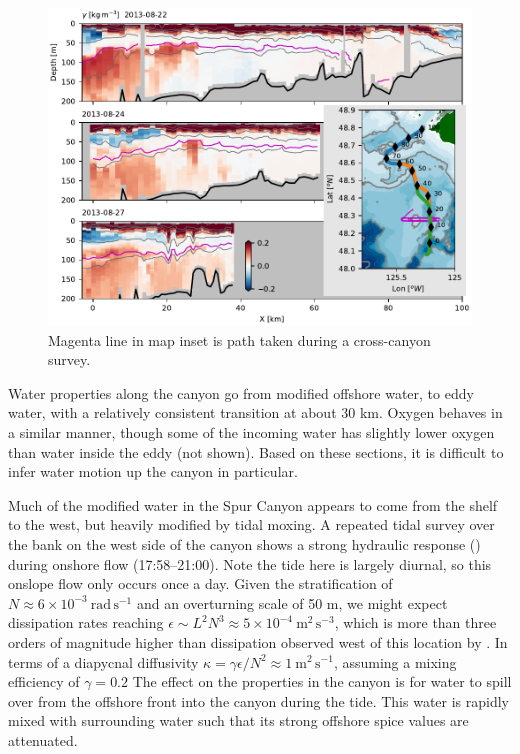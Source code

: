 \documentclass[draft]{agujournal2019}
\begin{document}
\begin{figure}[htbp]
  \begin{center}
    \includegraphics[width=6.2in]{CanyonPropertiesSpice}
    \caption{Magenta line in map inset is path taken during a cross-canyon survey.
      \label{fig:CanyonPropertiesSpice} }
  \end{center}
\end{figure}

Water properties along the canyon go from modified offshore water, to eddy water, with a relatively consistent transition at about 30 km.  Oxygen behaves in a similar manner, though some of the incoming water has slightly lower oxygen than water inside the eddy (not shown).  Based on these sections, it is difficult to infer water motion up the canyon in particular.

Much of the modified water in the Spur Canyon appears to come from the shelf to the west, but heavily modified by tidal moxing. A repeated tidal survey over the bank on the west side of the canyon shows a strong hydraulic response () during onshore flow (17:58--21:00).  Note the tide here is largely diurnal, so this onslope flow only occurs once a day.  Given the stratification of $N\approx 6\times10^{-3} \ \mathrm{rad\,s^{-1}}$ and an overturning scale of 50 m, we might expect dissipation rates reaching $\epsilon \sim L^2N^{3} \approx 5\times10^{-4}\ \mathrm{m^2\,s^{-3}}$, which is more than three orders of magnitude higher than dissipation observed west of this location by \cite{deweycrawford88}.  In terms of a diapycnal diffusivity $\kappa = \gamma \epsilon / N^2 \approx 1\ \mathrm{m^2\,s^{-1}}$, assuming a mixing efficiency of $\gamma=0.2$ The effect on the properties in the canyon is for water to spill over from the offshore front into the canyon during the tide.  This water is rapidly mixed with surrounding water such that its strong offshore spice values are attenuated.
\end{document}
